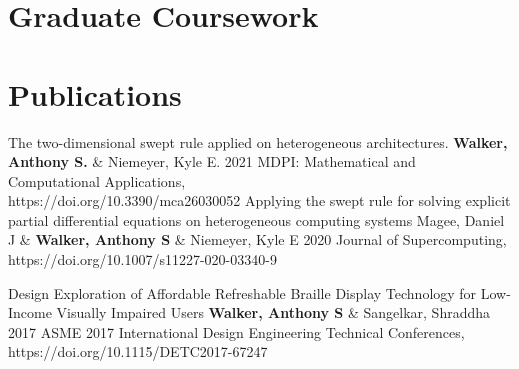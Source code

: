 \documentclass[%
               doublesided,
               paper=a4,
               fontsize=10pt
              ]{my-resume}
\begin{document}
{    %

    \section[\faPaperclip]{Graduate Coursework}

    \section[\faFile]{Publications}
    \publication
	{The two-dimensional swept rule applied on heterogeneous architectures.} %
	{\textbf{Walker, Anthony S.} \& Niemeyer,  Kyle E.} %
	{2021} %
	{MDPI: Mathematical and Computational Applications,\\ https://doi.org/10.3390/mca26030052} %
	{} %
	\publication
	{Applying the swept rule for solving explicit partial differential equations on heterogeneous computing systems} %
	{Magee, Daniel J \& \textbf{Walker, Anthony S} \& Niemeyer, Kyle E} %
	{2020} %
	{Journal of Supercomputing,\\ https://doi.org/10.1007/s11227-020-03340-9} %
	{} %

    \publication
	{Design Exploration of Affordable Refreshable Braille Display Technology for Low-Income Visually Impaired Users} %
	{\textbf{Walker, Anthony S} \& Sangelkar, Shraddha} %
	{2017} %
	{ASME 2017 International Design Engineering Technical Conferences, https://doi.org/10.1115/DETC2017-67247} %
	{} %
}


\makebody
\end{document}
